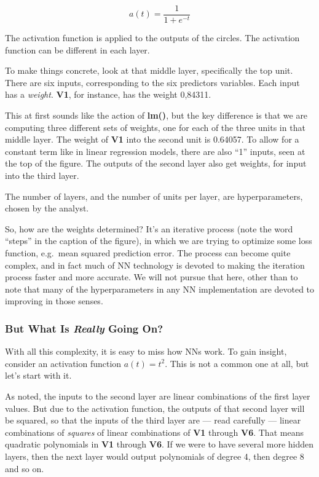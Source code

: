 \begin{equation}
\label{logit}
a(t) = \frac{1}{1 + e^{-t}}
\end{equation}

The activation function is applied to the outputs of the circles. The
activation function can be different in each layer.

To make things concrete, look at that middle layer, specifically the top
unit.  There are six inputs, corresponding to the six predictors
variables.  Each input has a \textit{weight}.  \textbf{V1}, for
instance, has the weight 0,84311.

This at first sounds like the action of \textbf{lm()}, but the key
difference is that we are computing three different sets of weights, one
for each of the three units in that middle layer.  The weight of
\textbf{V1} into the second unit is 0.64057.  To allow for a constant
term like in linear regression models, there are also ``1'' inputs, seen
at the top of the figure.  The outputs of the second layer also get
weights, for input into the third layer.

The number of layers, and the number of units per layer, are
hyperparameters, chosen by the analyst.

So, how are the weights determined?  It's an iterative process (note the
word ``steps'' in the caption of the figure), in which we are trying to
optimize some loss function, e.g.\ mean squared prediction error.  The
process can become quite complex, and in fact much of NN technology is
devoted to making the iteration process faster and more accurate.  We
will not pursue that here, other than to note that many of the
hyperparameters in any NN implementation are devoted to improving in
those senses.

\subsubsection{But What Is \emph{Really} Going On?}

With all this complexity, it is easy to miss how NNs work.  To gain
insight, consider an activation function $a(t) = t^2$.  This is not a
common one at all, but let's start with it.

As noted, the inputs to the second layer are linear combinations of the
first layer values.  But due to the activation function, the outputs of
that second layer will be squared, so that the inputs of the third layer
are --- read carefully --- linear combinations of \textit{squares} of
linear combinations of \textbf{V1} through \textbf{V6}.  That means
quadratic polynomials in \textbf{V1} through \textbf{V6}.  If we were to
have several more hidden layers, then the next layer would output
polynomials of degree 4, then degree 8 and so on.


